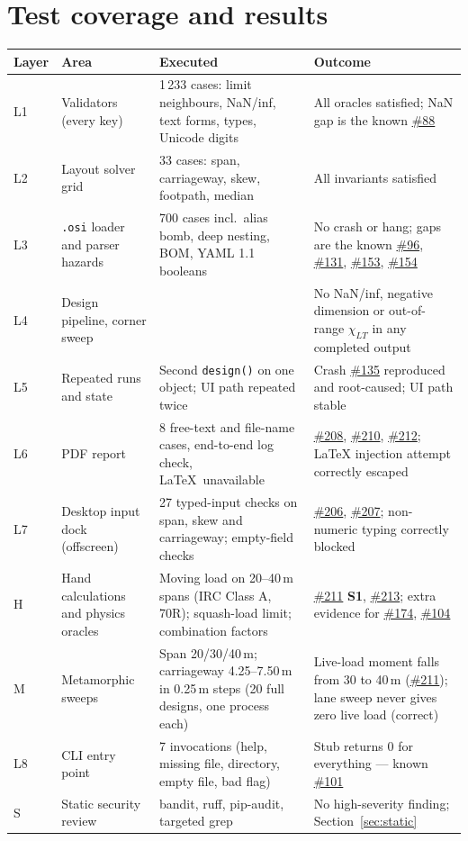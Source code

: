 \documentclass[11pt,a4paper]{article}
\newcommand{\issue}[1]{\href{https://github.com/Nidhikhare12/OsdagBridge/issues/#1}{\##1}}
\newcommand{\sevH}{\textcolor{sevhigh}{\textbf{S1}}}
\begin{document}
\section{Test coverage and results}\label{sec:coverage}
\begin{longtable}{@{}L{1.0cm}L{4.4cm}L{5.4cm}L{5.4cm}@{}}
\toprule
Layer & Area & Executed & Outcome \\
\midrule
\endhead
L1 & Validators (every key) & 1\,233 cases: limit neighbours, NaN/inf, text forms, types, Unicode digits & All oracles satisfied; NaN gap is the known \issue{88} \\
L2 & Layout solver grid & 33 cases: span, carriageway, skew, footpath, median & All invariants satisfied \\
L3 & \texttt{.osi} loader and parser hazards & 700 cases incl.\ alias bomb, deep nesting, BOM, YAML 1.1 booleans & No crash or hang; gaps are the known \issue{96}, \issue{131}, \issue{153}, \issue{154} \\
L4 & Design pipeline, corner sweep &  & No NaN/inf, negative dimension or out-of-range $\chi_{LT}$ in any completed output \\
L5 & Repeated runs and state & Second \texttt{design()} on one object; UI path repeated twice & Crash \issue{135} reproduced and root-caused; UI path stable \\
L6 & PDF report & 8 free-text and file-name cases, end-to-end log check, \LaTeX\ unavailable & \issue{208}, \issue{210}, \issue{212}; LaTeX injection attempt correctly escaped \\
L7 & Desktop input dock (offscreen) & 27 typed-input checks on span, skew and carriageway; empty-field checks & \issue{206}, \issue{207}; non-numeric typing correctly blocked \\
H & Hand calculations and physics oracles & Moving load on 20--40\,m spans (IRC Class A, 70R); squash-load limit; combination factors & \issue{211} \sevH, \issue{213}; extra evidence for \issue{174}, \issue{104} \\
M & Metamorphic sweeps & Span 20/30/40\,m; carriageway 4.25--7.50\,m in 0.25\,m steps (20 full designs, one process each) & Live-load moment falls from 30 to 40\,m (\issue{211}); lane sweep never gives zero live load (correct) \\
L8 & CLI entry point & 7 invocations (help, missing file, directory, empty file, bad flag) & Stub returns 0 for everything --- known \issue{101} \\
S & Static security review & bandit, ruff, pip-audit, targeted grep & No high-severity finding; Section~\ref{sec:static} \\
\bottomrule
\end{longtable}
\end{document}

